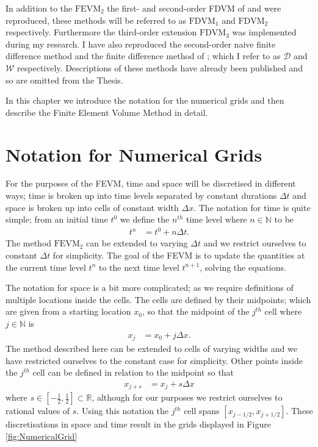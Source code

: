 In addition to the $\text{FEVM}_2$ the first- and second-order FDVM of \citet{Hank-etal-2010-2034} and \citet{Zoppou-etal-2017} were reproduced, these methods will be referred to as $\text{FDVM}_1$ and $\text{FDVM}_2$ respectively. Furthermore the third-order extension $\text{FDVM}_3$ was implemented during my research. I have also reproduced the second-order naive finite difference method \cite{Pitt-J-2014} and the finite difference method of \citet{El-etal-2006}; which I refer to as $\mathcal{D}$ and $\mathcal{W}$ respectively. Descriptions of these methods have already been published \cite{Zoppou-etal-2017,Pitt-2018-61} and so are omitted from the Thesis.  

In this chapter we introduce the notation for the numerical grids and then describe the Finite Element Volume Method in detail.

\section{Notation for Numerical Grids}

For the purposes of the FEVM, time and space will be discretised in different ways; time is broken up into time levels separated by constant durations $\Delta t$ and space is broken up into cells of constant width $\Delta x$. The notation for time is quite simple; from an initial time $t^0$ we define the $n^{th}$ time level where $n \in \mathbb{N}$ to be
\begin{align*}
t^n &= t^0 + n \Delta t.
\end{align*}
The method $\text{FEVM}_2$ can be extended to varying $\Delta t$ and we restrict ourselves to constant $\Delta t$ for simplicity. The goal of the FEVM is to update the quantities at the current time level $t^n$ to the next time level $t^{n+1}$, solving the equations. 

The notation for space is a bit more complicated; as we require definitions of multiple locations inside the cells. The cells are defined by their midpoints; which are given from a starting location $x_0$, so that the midpoint of the $j^{th}$ cell where $j \in \mathbb{N}$ is
\begin{align*}
x_j &= x_0 + j \Delta x.
\end{align*}
The method described here can be extended to cells of varying widths and we have restricted ourselves to the constant case for simplicity. Other points inside the $j^{th}$ cell can be defined in relation to the midpoint so that 
\begin{align*}
x_{j + s} &= x_j + s \Delta x
\end{align*}
where $s \in \left[-\frac{1}{2} , \frac{1}{2}\right]  \subset\mathbb{R}$, although for our purposes we restrict ourselves to rational values of $s$. Using this notation the $j^{th}$ cell spans $\left[x_{j -1/2},x_{j + 1/2}\right]$. These discretisations in space and time result in the grids displayed in Figure \ref{fig:NumericalGrid}

